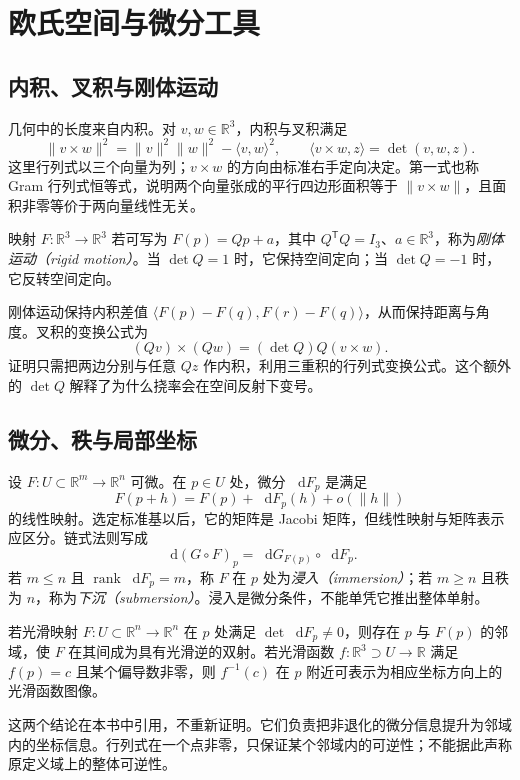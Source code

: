 \documentclass[UTF8,12pt,a4paper,fontset=fandol]{ctexbook}
\newcommand{\R}{\mathbb R}
\newcommand{\dd}{\mathop{}\!\mathrm d}
\newcommand{\ip}[2]{\langle #1,#2\rangle}
\newcommand{\norm}[1]{\lVert #1\rVert}
\DeclareMathOperator{\rank}{rank}
\begin{document}
\mainmatter

\chapter{欧氏空间与微分工具}
\label{chap:dg-tools}

\section{内积、叉积与刚体运动}
几何中的长度来自内积。对 $v,w\in\R^3$，内积与叉积满足
\[
 \norm{v\times w}^2=\norm v^2\norm w^2-\ip vw^2,
 \qquad \ip{v\times w}{z}=\det(v,w,z).
\]
这里行列式以三个向量为列；$v\times w$ 的方向由标准右手定向决定。第一式也称 Gram 行列式恒等式，说明两个向量张成的平行四边形面积等于 $\norm{v\times w}$，且面积非零等价于两向量线性无关。

\begin{definition}[欧氏刚体运动]
映射 $F:\R^3\to\R^3$ 若可写为 $F(p)=Qp+a$，其中 $Q^{\mathsf T}Q=I_3$、$a\in\R^3$，称为\emph{刚体运动（rigid motion）}。当 $\det Q=1$ 时，它保持空间定向；当 $\det Q=-1$ 时，它反转空间定向。
\end{definition}
刚体运动保持内积差值 $\ip{F(p)-F(q)}{F(r)-F(q)}$，从而保持距离与角度。叉积的变换公式为
\[
 (Qv)\times(Qw)=(\det Q)Q(v\times w).
\]
证明只需把两边分别与任意 $Qz$ 作内积，利用三重积的行列式变换公式。这个额外的 $\det Q$ 解释了为什么挠率会在空间反射下变号。

\section{微分、秩与局部坐标}
设 $F:U\subset\R^m\to\R^n$ 可微。在 $p\in U$ 处，微分 $\dd F_p$ 是满足
\[
 F(p+h)=F(p)+\dd F_p(h)+o(\norm h)
\]
的线性映射。选定标准基以后，它的矩阵是 Jacobi 矩阵，但线性映射与矩阵表示应区分。链式法则写成
\begin{equation}
 \dd(G\circ F)_p=\dd G_{F(p)}\circ\dd F_p.
 \label{eq:dg-chain}
\end{equation}
若 $m\le n$ 且 $\rank\dd F_p=m$，称 $F$ 在 $p$ 处为\emph{浸入（immersion）}；若 $m\ge n$ 且秩为 $n$，称为\emph{下沉（submersion）}。浸入是微分条件，不能单凭它推出整体单射。

\begin{theorem}
若光滑映射 $F:U\subset\R^n\to\R^n$ 在 $p$ 处满足 $\det\dd F_p\ne0$，则存在 $p$ 与 $F(p)$ 的邻域，使 $F$ 在其间成为具有光滑逆的双射。若光滑函数 $f:\R^3\supset U\to\R$ 满足 $f(p)=c$ 且某个偏导数非零，则 $f^{-1}(c)$ 在 $p$ 附近可表示为相应坐标方向上的光滑函数图像。
\label{thm:dg-ift}
\end{theorem}
这两个结论在本书中引用，不重新证明。它们负责把非退化的微分信息提升为邻域内的坐标信息。行列式在一个点非零，只保证某个邻域内的可逆性；不能据此声称原定义域上的整体可逆性。
\end{document}
